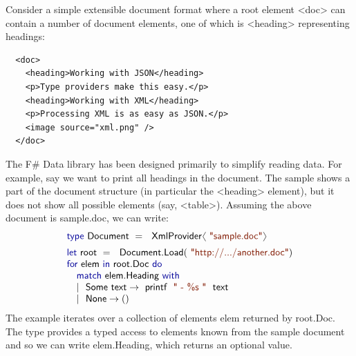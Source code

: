 \documentclass[10pt,preprint,blind,clearpagebib]{sigplanconf}
\newcommand{\langl}{\begin{picture}(4.5,7)
\put(1.1,2.5){\rotatebox{60}{\line(1,0){5.5}}}
\put(1.1,2.5){\rotatebox{300}{\line(1,0){5.5}}}
\end{picture}}
\newcommand{\rangl}{\begin{picture}(4.5,7)
\put(.9,2.5){\rotatebox{120}{\line(1,0){5.5}}}
\put(.9,2.5){\rotatebox{240}{\line(1,0){5.5}}}
\end{picture}}
\newcommand{\kvd}[1]{\textnormal{\textcolor{kvdclr}{\sffamily #1}}}
\newcommand{\str}[1]{\textnormal{\textcolor{strclr}{\sffamily "#1"}}}
\newcommand{\strf}[1]{\textnormal{\textcolor{strclr}{\sffamily #1}}}
\newcommand{\ident}[1]{\textnormal{\sffamily #1}}
\begin{document}
Consider a simple extensible document format where a root element
{\ttfamily\small <doc>} can contain a number of document elements, one of which is
{\ttfamily\small <heading>} representing headings:
%
{\small{
\begin{verbatim}
  <doc>
    <heading>Working with JSON</heading>
    <p>Type providers make this easy.</p>
    <heading>Working with XML</heading>
    <p>Processing XML is as easy as JSON.</p>
    <image source="xml.png" />
  </doc>
\end{verbatim}
}}
%
\noindent
The F\# Data library has been designed primarily to simplify reading data. For example,
say we want to print all headings in the document. The sample shows a part of the document structure 
(in particular the {\ttfamily\small <heading>} element), but it does not show all possible elements 
(say, {\ttfamily\small <table>}). Assuming the above document is \strf{sample.doc}, we can write:
%
\noindent
\begin{equation*}
\begin{array}{l}
 \kvd{type}~\ident{Document}~=~\ident{XmlProvider}\langl\str{sample.doc}\rangl\hspace{1em} \\[0.5em]
 \kvd{let}~\ident{root}~=~\ident{Document.Load}(\str{http://.../another.doc})\\
 \kvd{for}~\ident{elem}~\kvd{in}~\ident{root.Doc}~\kvd{do}\\
 \quad\kvd{match}~\ident{elem.Heading}~\kvd{with} \\
 \quad|~\ident{Some text} \rightarrow \ident{printf}~\str{ - \%s }~\ident{text}\\
 \quad|~\ident{None} \rightarrow ()\\
\end{array}
\end{equation*}
%
The example iterates over a collection of elements \ident{elem} returned by \ident{root.Doc}. 
The type provides a typed access to elements known from the sample document and so we can
write \ident{elem.Heading}, which returns an optional value.
\end{document}
